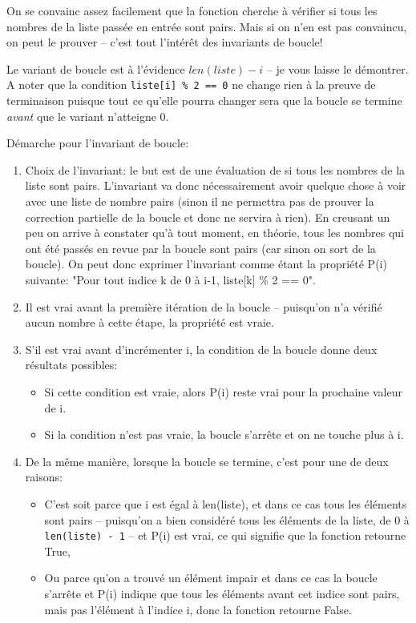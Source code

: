 \documentclass[12pt]{article}
\begin{document}
	\begin{MaReponse}
		\begin{alphenum}
			\item On se convainc assez facilement que la fonction cherche à vérifier si tous les nombres de la liste passée en entrée sont pairs. Mais si on n'en est pas convaincu, on peut le prouver -- c'est tout l'intérêt des invariants de boucle!
			\item Le variant de boucle est à l'évidence $len(liste) - i$ -- je vous laisse le démontrer. A noter que la condition \texttt{liste[i] \% 2 == 0} ne change rien à la preuve de terminaison puisque tout ce qu'elle pourra changer sera que la boucle se termine \textit{avant} que le variant n'atteigne 0.
			\item Démarche pour l'invariant de boucle:
			\begin{enumerate}
				\item Choix de l'invariant: le but est de une évaluation de si tous les nombres de la liste sont pairs. L'invariant va donc nécessairement avoir quelque chose à voir avec une liste de nombre pairs (sinon il ne permettra pas de prouver la correction partielle de la boucle et donc ne servira à rien). En creusant un peu on arrive à constater qu'à tout moment, en théorie, tous les nombres qui ont été passés en revue par la boucle sont pairs (car sinon on sort de la boucle). On peut donc exprimer l'invariant comme étant la propriété P(i) suivante: "Pour tout indice k de 0 à i-1, liste[k] \% 2 == 0".
				\item Il est vrai avant la première itération de la boucle -- puisqu'on n'a vérifié aucun nombre à cette étape, la propriété est vraie.
				\item S'il est vrai avant d'incrémenter i, la condition de la boucle donne deux résultats possibles:
				\begin{itemize}
					\item Si cette condition est vraie, alors P(i) reste vrai pour la prochaine valeur de i.
					\item Si la condition n'est pas vraie, la boucle s'arrête et on ne touche plus à i.
				\end{itemize}
				\item De la même manière, lorsque la boucle se termine, c'est pour une de deux raisons:
				\begin{itemize}
					\item C'est soit parce que i est égal à len(liste), et dans ce cas tous les éléments sont pairs -- puisqu'on a bien considéré tous les éléments de la liste, de 0 à \texttt{len(liste) - 1} -- et P(i) est vrai, ce qui signifie que la fonction retourne True,
					\item Ou parce qu'on a trouvé un élément impair et dans ce cas la boucle s'arrête et P(i) indique que tous les éléments avant cet indice sont pairs, mais pas l'élément à l'indice i, donc la fonction retourne False.
				\end{itemize}
			\end{enumerate}
		\end{alphenum}
	\end{MaReponse}
	
\end{document}
